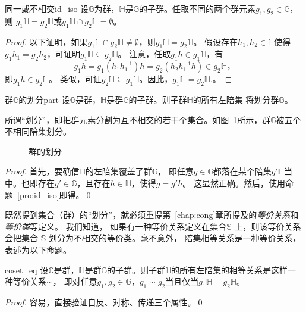  	\begin{proposition}{同一或不相交}{id_iso}
 		设$\mathbb{G}$为群，$\mathbb{H}$是$\mathbb{G}$的子群。任取不同的两个群元素$ g_1 , g_2 \in \mathbb{G}$，则
 		$g_1 \mathbb{H} = g_2 \mathbb{H}$或$g_1 \mathbb{H} \cap g_2 \mathbb{H} = \emptyset$。
 	\end{proposition}
 
 \begin{proof}
    以下证明，如果$g_1 \mathbb{H} \cap g_2 \mathbb{H} \ne \emptyset$，则$g_1 \mathbb{H} = g_2 \mathbb{H}$。
 	假设存在$h_1, h_2 \in \mathbb{H}$使得$g_1 h_1 = g_2 h_2$，可证明$g_1 \mathbb{H} \subseteq g_2 \mathbb{H}$。
 	注意，任取$g_1 h \in g_1 \mathbb{H}$，有
 	\[ g_1 h = g_1 (h_1 h_1^{-1}) h = g_2 (h_2 h_1^{-1} h ) \in g_2 \mathbb{H} \text{，}\]
 	即$g_1 h  \in g_2 \mathbb{H}$。
 	类似，可证$g_2 \mathbb{H} \subseteq g_1 \mathbb{H}$。因此，$g_1 \mathbb{H} = g_2 \mathbb{H}$.。
 \end{proof}
 
 \begin{proposition}{群$\mathbb{G}$的划分}{part}
 	设$\mathbb{G}$是群，$\mathbb{H}$是群$\mathbb{G}$的子群。则子群$\mathbb{H}$的所有左陪集
 	将划分群$\mathbb{G}$。 
 \end{proposition}
 
 所谓“划分”，即把群元素分割为互不相交的若干个集合。如图~\ref{fig:gr_par}所示，群$\mathbb{G}$被五个不相同陪集划分。
 
 \begin{figure}[htbp]
 \centering
 
 \caption{群的划分}
 \label{fig:gr_par}       %
 \end{figure}
 
 \begin{proof}
 	首先，要确信$\mathbb{H}$的左陪集覆盖了群$\mathbb{G}$，
 	即任意$g \in \mathbb{G}$都落在某个陪集$g' \mathbb{H}$当中。也即存在$g' \in \mathbb{G}$，且存在$h \in \mathbb{H}$，使得$g = g'h$。
 	这显然正确。然后，使用命题~\ref{pro:id_iso}即得。\qed
 \end{proof}
 

既然提到集合（群）的“划分”，就必须重提第~\ref{chap:cong}章所提及的\emph{等价关系}和\emph{等价类}等定义。
我们知道，
如果有一种等价关系定义在集合$\mathbb{S}$ 上，则该等价关系会把集合 $\mathbb{S}$ 划分为不相交的等价类。毫不意外，
陪集相等关系是一种等价关系，表述为以下命题。
\begin{proposition}{}{coset_eq}
设$\mathbb{G}$是群，$\mathbb{H}$是群$\mathbb{G}$的子群。则子群$\mathbb{H}$的所有左陪集的相等关系是这样一种等价关系$\sim$，
即对任意$g_1, g_2 \in \mathbb{G}$，$g_1 \sim g_2$当且仅当$g_1 \mathbb{H} = g_2 \mathbb{H}$。
\end{proposition}
\begin{proof}
容易，直接验证自反、对称、传递三个属性。\qed
\end{proof}

